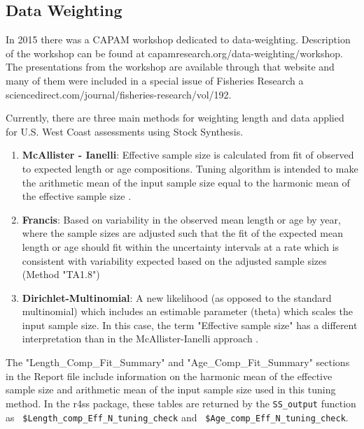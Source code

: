 \subsection{Data Weighting}
\label{sec:DataWeight}

\begin{sloppypar}
In 2015 there was a CAPAM workshop dedicated to data-weighting. Description of the workshop can be found at capamresearch.org/data-weighting/workshop. The presentations from the workshop are available through that website and many of them were included in a special issue of Fisheries Research a sciencedirect.com/journal/fisheries-research/vol/192.
\end{sloppypar}

Currently, there are three main methods for weighting length and data applied for U.S. West Coast assessments using Stock Synthesis.

\begin{enumerate}
	\item \textbf{McAllister - Ianelli}: Effective sample size is calculated from fit of observed to expected length or age compositions. Tuning algorithm is intended to make the arithmetic mean of the input sample size equal to the harmonic mean of the effective sample size \citep{mcallister_bayesian_1997}.
	
	\item \textbf{Francis}: Based on variability in the observed mean length or age by year, where the sample sizes are adjusted such that the fit of the expected mean length or age should fit within the uncertainty intervals at a rate which is consistent with variability expected based on the adjusted sample sizes (Method "TA1.8") \citep{francis_data_2011}
	
	\item \textbf{Dirichlet-Multinomial}: A new likelihood (as opposed to the standard multinomial) which includes an estimable parameter (theta) which scales the input sample size. In this case, the term "Effective sample size" has a different interpretation than in the McAllister-Ianelli approach \citep{thorson_model-based_2017}.
\end{enumerate}


The "Length\_Comp\_Fit\_Summary" and "Age\_Comp\_Fit\_Summary" sections in the Report file include information on the harmonic mean of the effective sample size and arithmetic mean of the input sample size used in this tuning method. In the r4ss package, these tables are returned by the \texttt{SS\_output} function as \texttt{ \$Length\_comp\_Eff\_N\_tuning\_check} and \texttt{ \$Age\_comp\_Eff\_N\_tuning\_check}.

